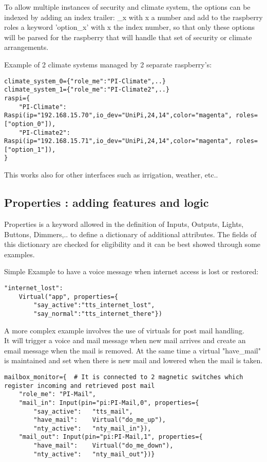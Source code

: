 To allow multiple instances of security and climate system, the options
can be indexed by adding an index trailer: \_x with x a number and add
to the raspberry roles a keyword 'option\_x' with x the index number, so
that only these options will be parsed for the raspberry that will
handle that set of security or climate arrangements.

Example of 2 climate systems managed by 2 separate raspberry's:

\begin{verbatim}
climate_system_0={"role_me":"PI-Climate",..}
climate_system_1={"role_me":"PI-Climate2",..}
raspi={
    "PI-Climate":  Raspi(ip="192.168.15.70",io_dev="UniPi,24,14",color="magenta", roles=["option_0"]),
    "PI-Climate2": Raspi(ip="192.168.15.71",io_dev="UniPi,24,14",color="magenta", roles=["option_1"]),
}
\end{verbatim}

This works also for other interfaces such as irrigation, weather, etc..

\subsection{Properties : adding features and logic}

Properties is a keyword allowed in the definition of Inputs, Outputs,
Lights, Buttons, Dimmers,.. to define a dictionary of additional
attributes. The fields of this dictionary are checked for eligibility
and it can be best showed through some examples.

Simple Example to have a voice message when internet access is lost or
restored:

\begin{verbatim}
"internet_lost":
    Virtual("app", properties={
        "say_active":"tts_internet_lost",
        "say_normal":"tts_internet_there"})
\end{verbatim}

A more complex example involves the use of virtuals for post mail
handling.\\
It will trigger a voice and mail message when new mail arrives and
create an email message when the mail is removed. At the same time a
virtual "have\_mail" is maintained and set when there is new mail and
lowered when the mail is taken.

\begin{verbatim}
mailbox_monitor={  # It is connected to 2 magnetic switches which register incoming and retrieved post mail
    "role_me": "PI-Mail",                                               
    "mail_in": Input(pin="pi:PI-Mail,0", properties={
        "say_active":   "tts_mail",
        "have_mail":    Virtual("do_me_up"),
        "nty_active":   "nty_mail_in"}),
    "mail_out": Input(pin="pi:PI-Mail,1", properties={
        "have_mail":    Virtual("do_me_down"),
        "nty_active":   "nty_mail_out"})}
\end{verbatim}


